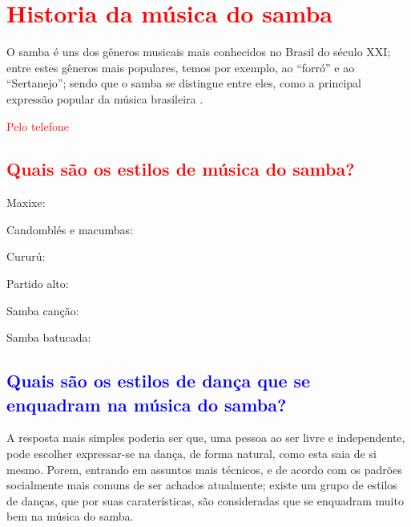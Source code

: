 \section{\textcolor{red}{Historia da música do samba}}

O samba é uns dos gêneros musicais mais conhecidos no Brasil do século XXI;
entre estes gêneros mais populares, temos por exemplo, ao ``forró'' e ao ``Sertanejo'';
sendo que o samba se distingue entre eles, 
como a principal expressão popular da música brasileira \cite[pp. 47]{diniz2008almanaque}. 

\textcolor{red}{Pelo telefone\cite{musicapelotelefone}}

\subsection{\textcolor{red}{Quais são os estilos de música do samba?}}

\begin{description}
\item[Maxixe:] \cite[pp. 9]{musicasambavariasdef1} 
\item[Candomblés e macumbas:] \cite[pp. 9]{musicasambavariasdef1} 
\item[Cururú:] \cite[pp. 9]{musicasambavariasdef1} 
\item[Partido alto:] \cite[pp. 9]{musicasambavariasdef1} 
\item[Samba canção:] \cite[pp. 9]{musicasambavariasdef1} 
\item[Samba batucada:] \cite[pp. 9]{musicasambavariasdef1} 
\end{description}

\subsection{\textcolor{blue}{Quais são os estilos de dança que se enquadram na música do samba?}}
\label{subsec:estilosdedanca}
A resposta mais simples poderia ser que, uma pessoa ao ser livre e independente,
pode escolher expressar-se na dança, de forma natural, como esta saia de si mesmo.
Porem, entrando em assuntos mais técnicos, 
e de acordo com os padrões socialmente mais comuns de ser achados atualmente;
existe um grupo de estilos de danças, que por suas caraterísticas, 
são consideradas que se enquadram muito bem na música do samba.

